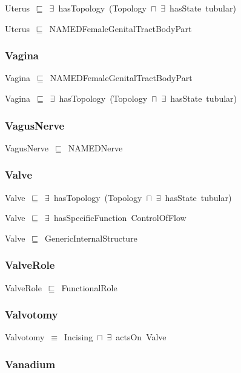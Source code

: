 \documentclass{article}
\begin{document}
Uterus~\ensuremath{\sqsubseteq}~\ensuremath{\exists}~hasTopology~(Topology~\ensuremath{\sqcap}~\ensuremath{\exists}~hasState~tubular)~

Uterus~\ensuremath{\sqsubseteq}~NAMEDFemaleGenitalTractBodyPart~

\subsubsection*{Vagina}

Vagina~\ensuremath{\sqsubseteq}~NAMEDFemaleGenitalTractBodyPart~

Vagina~\ensuremath{\sqsubseteq}~\ensuremath{\exists}~hasTopology~(Topology~\ensuremath{\sqcap}~\ensuremath{\exists}~hasState~tubular)~

\subsubsection*{VagusNerve}

VagusNerve~\ensuremath{\sqsubseteq}~NAMEDNerve~

\subsubsection*{Valve}

Valve~\ensuremath{\sqsubseteq}~\ensuremath{\exists}~hasTopology~(Topology~\ensuremath{\sqcap}~\ensuremath{\exists}~hasState~tubular)~

Valve~\ensuremath{\sqsubseteq}~\ensuremath{\exists}~hasSpecificFunction~ControlOfFlow~

Valve~\ensuremath{\sqsubseteq}~GenericInternalStructure~

\subsubsection*{ValveRole}

ValveRole~\ensuremath{\sqsubseteq}~FunctionalRole~

\subsubsection*{Valvotomy}

Valvotomy~\ensuremath{\equiv}~Incising~\ensuremath{\sqcap}~\ensuremath{\exists}~actsOn~Valve

\subsubsection*{Vanadium}
\end{document}
